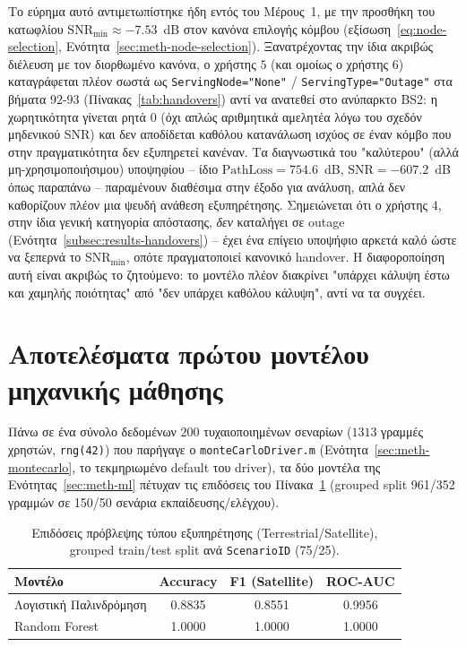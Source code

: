 Το εύρημα αυτό αντιμετωπίστηκε ήδη εντός του Μέρους~1, με την προσθήκη
του κατωφλίου $\text{SNR}_{\min} \approx -7.53$~dB στον κανόνα επιλογής
κόμβου (εξίσωση~\eqref{eq:node-selection}, Ενότητα~\ref{sec:meth-node-selection}).
Ξανατρέχοντας την ίδια ακριβώς διέλευση με τον διορθωμένο κανόνα, ο
χρήστης $5$ (και ομοίως ο χρήστης $6$) καταγράφεται πλέον σωστά ως
\texttt{ServingNode="None"} / \texttt{ServingType="Outage"} στα βήματα
$92$-$93$ (Πίνακας~\ref{tab:handovers}) αντί να ανατεθεί στο ανύπαρκτο
BS2: η χωρητικότητα γίνεται ρητά $0$ (όχι απλώς αριθμητικά αμελητέα λόγω
του σχεδόν μηδενικού SNR) και δεν αποδίδεται καθόλου κατανάλωση ισχύος σε
έναν κόμβο που στην πραγματικότητα δεν εξυπηρετεί κανέναν. Τα διαγνωστικά
του "καλύτερου" (αλλά μη-χρησιμοποιήσιμου) υποψηφίου -- ίδιο
$\text{PathLoss} = 754.6$~dB, $\text{SNR} = -607.2$~dB όπως παραπάνω --
παραμένουν διαθέσιμα στην έξοδο για ανάλυση, απλά δεν καθορίζουν πλέον
μια ψευδή ανάθεση εξυπηρέτησης. Σημειώνεται ότι ο χρήστης $4$, στην ίδια
γενική κατηγορία απόστασης, \emph{δεν} καταλήγει σε outage (Ενότητα~\ref{subsec:results-handovers}) -- έχει ένα επίγειο υποψήφιο
αρκετά καλό ώστε να ξεπερνά το $\text{SNR}_{\min}$, οπότε πραγματοποιεί
κανονικό handover. Η διαφοροποίηση αυτή είναι ακριβώς το ζητούμενο: το
μοντέλο πλέον διακρίνει "υπάρχει κάλυψη έστω και χαμηλής ποιότητας" από
"δεν υπάρχει καθόλου κάλυψη", αντί να τα συγχέει.

\section{Αποτελέσματα πρώτου μοντέλου μηχανικής μάθησης}
\label{sec:results-ml}

Πάνω σε ένα σύνολο δεδομένων $200$ τυχαιοποιημένων σεναρίων
($1313$ γραμμές χρηστών, \texttt{rng(42)}) που παρήγαγε ο
\texttt{monteCarloDriver.m} (Ενότητα~\ref{sec:meth-montecarlo}, το
τεκμηριωμένο default του driver), τα δύο μοντέλα της
Ενότητας~\ref{sec:meth-ml} πέτυχαν τις επιδόσεις του
Πίνακα~\ref{tab:ml-results} (grouped split 961/352 γραμμών σε
150/50 σενάρια εκπαίδευσης/ελέγχου).

\begin{table}[htbp]
\centering
\caption{Επιδόσεις πρόβλεψης τύπου εξυπηρέτησης (Terrestrial/Satellite),
grouped train/test split ανά \texttt{ScenarioID} (75/25).}
\label{tab:ml-results}
\begin{tabular}{@{}l c c c@{}}
\toprule
Μοντέλο & Accuracy & F1 (Satellite) & ROC-AUC \\
\midrule
Λογιστική Παλινδρόμηση & 0.8835 & 0.8551 & 0.9956 \\
Random Forest          & 1.0000 & 1.0000 & 1.0000 \\
\bottomrule
\end{tabular}
\end{table}


